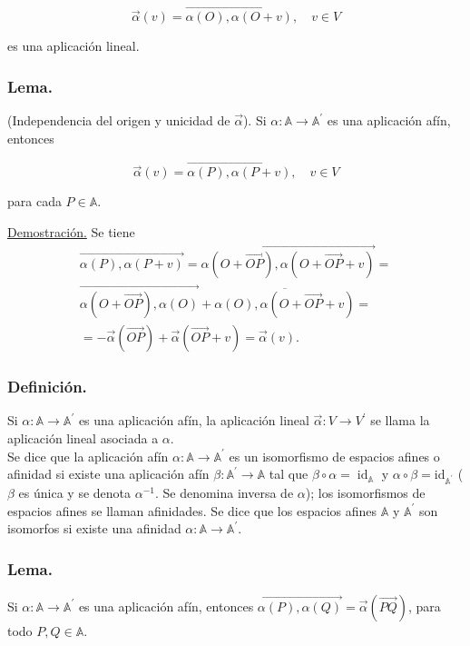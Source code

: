 \documentclass[12pt, a4paper, ones, notitlepage, openany,titlepage]{article}
\begin{document}
$$
\vec{\alpha}(v)=\overrightarrow{\alpha(O), \alpha(O+v)}, \quad v \in V
$$

es una aplicación lineal.

\subsubsection{Lema.} (Independencia del origen y unicidad de $\overrightarrow{\alpha}$). Si $\alpha: \mathbb{A} \rightarrow \mathbb{A}^{\prime}$ es una aplicación afín, entonces

$$
\vec{\alpha}(v)=\overrightarrow{\alpha(P), \alpha(P+v)}, \quad v \in V
$$

para cada $P \in \mathbb{A}$.

\underline{Demostración.} Se tiene
\begin{gather*}
\overrightarrow{\alpha(P), \alpha(P+v)} =\overrightarrow{\alpha(O+\overrightarrow{O P}), \alpha(O+\overrightarrow{O P}+v)}=\\\overrightarrow{\alpha(O+\overrightarrow{O P}), \alpha(O)}+\overline{\alpha(O), \alpha(O+\overrightarrow{O P}+v)} = \\ =-\vec{\alpha}(\overrightarrow{O P})+\vec{\alpha}(\overrightarrow{O P}+v)=\vec{\alpha}(v).
\end{gather*}


\subsubsection{Definición.} Si $\alpha: \mathbb{A} \rightarrow \mathbb{A}^{\prime}$ es una aplicación afín, la aplicación lineal $\vec{\alpha}: V \rightarrow V^{\prime}$ se llama la aplicación lineal asociada a $\alpha$.\\

Se dice que la aplicación afín $\alpha: \mathbb{A} \rightarrow \mathbb{A}^{\prime}$ es un isomorfismo de espacios afines o afinidad si existe una aplicación afín $\beta: \mathbb{A}^{\prime} \rightarrow \mathbb{A}$ tal que $\beta \circ \alpha=\operatorname{id}_{\mathbb{A}}$ y $\alpha \circ \beta=\mathrm{id}_{\mathbb{A}^{\prime}}$ ($\beta$ es única y se denota $\alpha^{-1}$. Se denomina inversa de $\alpha$); los isomorfismos de espacios afines se llaman afinidades. Se dice que los espacios afines $\mathbb{A}$ y $\mathbb{A}^{\prime}$ son isomorfos si existe una afinidad $\alpha: \mathbb{A} \rightarrow \mathbb{A}^{\prime}$.\\

\subsubsection{Lema.} Si $\alpha: \mathbb{A} \rightarrow \mathbb{A}^{\prime}$ es una aplicación afín, entonces $\overrightarrow{\alpha(P), \alpha(Q)}=\vec{\alpha}(\overrightarrow{P Q})$, para todo $P, Q \in \mathbb{A}$.
\end{document}
